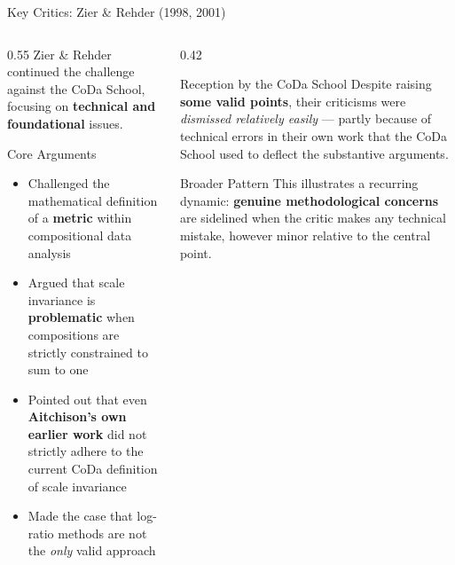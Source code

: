 \begin{frame}{Key Critics: Zier \& Rehder (1998, 2001)}

\begin{columns}[T]
  \begin{column}{0.55\textwidth}
    Zier \& Rehder continued the challenge against the CoDa School,
    focusing on \textbf{technical and foundational} issues.

    \vspace{0.3cm}
    \begin{block}{Core Arguments}
      \begin{itemize}
        \item Challenged the mathematical definition of a
              \textbf{metric} within compositional data analysis
        \item Argued that scale invariance is \textbf{problematic}
              when compositions are strictly constrained to sum to one
        \item Pointed out that even \textbf{Aitchison's own earlier
              work} did not strictly adhere to the current CoDa
              definition of scale invariance
        \item Made the case that log-ratio methods are not the
              \emph{only} valid approach
      \end{itemize}
    \end{block}
  \end{column}

  \begin{column}{0.42\textwidth}
    \begin{block}{Reception by the CoDa School}
      Despite raising \textbf{some valid points}, their criticisms
      were \textit{dismissed relatively easily} — partly because
      of technical errors in their own work that the CoDa School
      used to deflect the substantive arguments.
    \end{block}

    \vspace{0.3cm}
    \begin{alertblock}{Broader Pattern}
      This illustrates a recurring dynamic: \textbf{genuine
      methodological concerns} are sidelined when the critic
      makes any technical mistake, however minor relative to
      the central point.
    \end{alertblock}
  \end{column}
\end{columns}

\end{frame}

